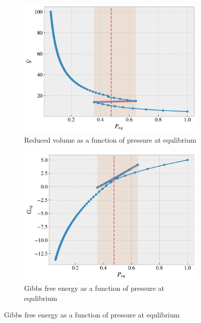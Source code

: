 \documentclass[reprint, amsmath, amssymb, aps, onecolumn]{revtex4-2}
\begin{document}
\begin{figure}[H]
     \centering
     \begin{subfigure}[b]{0.49\textwidth}
         \centering
         \includegraphics[width=\textwidth]{figures/VeqP.pdf}
         \caption{Reduced volume as a function of pressure at equlibrium}
         \label{fig:VeqP}
     \end{subfigure}
     \hfill
     \centering
     \begin{subfigure}[b]{0.49\textwidth}
         \centering
         \includegraphics[width=\textwidth]{figures/Geq.pdf}
         \caption{Gibbs free energy as a function of pressure at equlibrium }
         \label{fig:Geq}
     \end{subfigure}

\end{figure}
\end{document}
